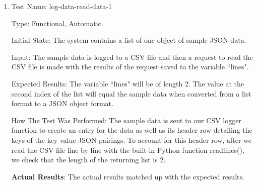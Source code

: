 \documentclass[12pt, titlepage]{article}
\begin{document}
	\begin{enumerate}
		\item{Test Name: log-data-read-data-1}
		
		Type: Functional, Automatic.
		
		Initial State: The system contains a list of one object of sample JSON data.
		
		Input: The sample data is logged to a CSV file and then a request to read the CSV file is made with the results of the request saved to the variable ``lines".
		
		Expected Results: The variable ``lines" will be of length 2. The value at the second index of the list will equal the sample data when converted from a list format to a JSON object format. 
		
		How The Test Was Performed: The sample data is sent to our CSV logger function to create an entry for the data as well as its header row detailing the keys of the key value JSON pairings. To account for this header row, after we read the CSV file line by line with the built-in Python function readlines(), we check that the length of the returning list is 2.
		
		\textbf{Actual Results}: The actual results matched up with the expected results.
	\end{enumerate}
\end{document}
